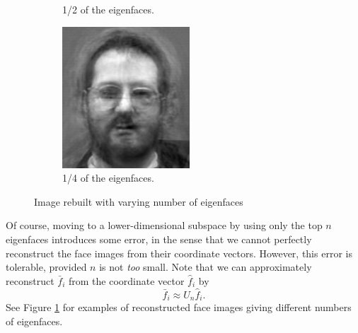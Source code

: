 \begin{figure}
\begin{subfigure}[b]{0.3\textwidth}
\caption{1/2 of the eigenfaces.}
\end{subfigure}
\begin{subfigure}[b]{0.3\textwidth}
\includegraphics[width=\textwidth]{rebuiltFourth.png}
\caption{1/4 of the eigenfaces.}
\end{subfigure}
\caption{Image rebuilt with varying number of eigenfaces}
\label{facialRecognition:rebuiltImage}
\end{figure}
Of course, moving to a lower-dimensional subspace by using only the top $n$ eigenfaces introduces some error, in the sense that we cannot perfectly
reconstruct the face images from their coordinate vectors.
However, this error is tolerable, provided $n$ is not \emph{too} small.
Note that we can approximately reconstruct $\bar{f}_i$ from the coordinate vector $\hat{f}_i$ by
\[
\bar{f}_i \approx U_n\hat{f}_i.
\]
See Figure \ref{facialRecognition:rebuiltImage} for examples of reconstructed face images giving different numbers of eigenfaces.

